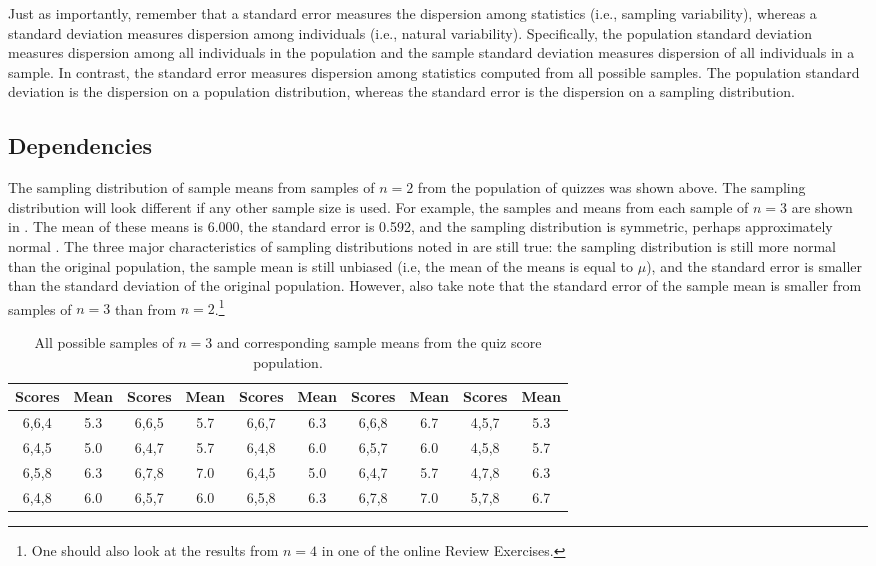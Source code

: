 \documentclass[10pt,openany]{book}\usepackage[]{graphicx}\usepackage[]{color}
\begin{document}
Just as importantly, remember that a standard error measures the dispersion among statistics (i.e., sampling variability), whereas a standard deviation measures dispersion among individuals (i.e., natural variability). Specifically, the population standard deviation measures dispersion among all individuals in the population and the sample standard deviation measures dispersion of all individuals in a sample. In contrast, the standard error measures dispersion among statistics computed from all possible samples. The population standard deviation is the dispersion on a population distribution, whereas the standard error is the dispersion on a sampling distribution.


\vspace{-6pt}
\subsection{Dependencies}
\vspace{-6pt}


The sampling distribution of sample means from samples of $n=2$ from the population of quizzes was shown above. The sampling distribution will look different if any other sample size is used. For example, the samples and means from each sample of $n=3$ are shown in . The mean of these means is 6.000, the standard error is 0.592, and the sampling distribution is symmetric, perhaps approximately normal . The three major characteristics of sampling distributions noted in  are still true: the sampling distribution is still more normal than the original population, the sample mean is still unbiased (i.e, the mean of the means is equal to $\mu$), and the standard error is smaller than the standard deviation of the original population. However, also take note that the standard error of the sample mean is smaller from samples of $n=3$ than from $n=2$.\footnote{One should also look at the results from $n=4$ in one of the online Review Exercises.}

\begin{table}[htbp]
  \caption{All possible samples of $n=3$ and corresponding sample means from the quiz score population.}
  \label{tab:SDistQuiz3}
  \centering
    \begin{tabular}{cc||cc||cc||cc||cc}
\hline\hline
Scores & Mean & Scores & Mean & Scores &  Mean & Scores & Mean & Scores & Mean \\
\hline
6,6,4 & 5.3 & 6,6,5 & 5.7 & 6,6,7 & 6.3 & 6,6,8 & 6.7 & 4,5,7 & 5.3 \\
6,4,5 & 5.0 & 6,4,7 & 5.7 & 6,4,8 & 6.0 & 6,5,7 & 6.0 & 4,5,8 & 5.7 \\
6,5,8 & 6.3 & 6,7,8 & 7.0 & 6,4,5 & 5.0 & 6,4,7 & 5.7 & 4,7,8 & 6.3 \\
6,4,8 & 6.0 & 6,5,7 & 6.0 & 6,5,8 & 6.3 & 6,7,8 & 7.0 & 5,7,8 & 6.7 \\
\hline\hline
    \end{tabular}
\end{table}
\end{document}
